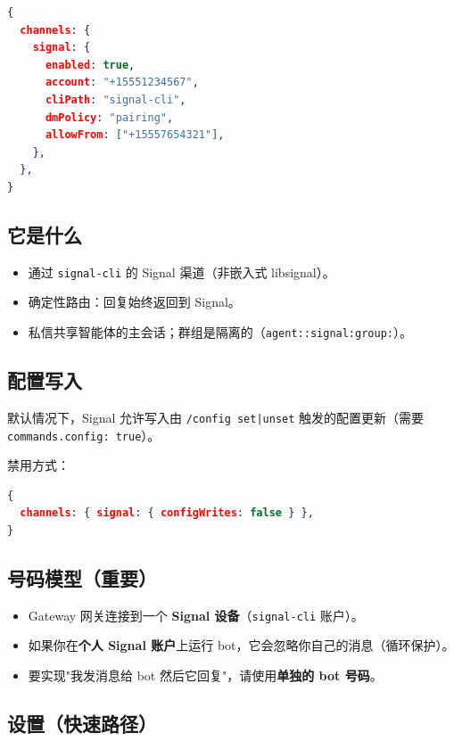 \begin{lstlisting}[language=json]
{
  channels: {
    signal: {
      enabled: true,
      account: "+15551234567",
      cliPath: "signal-cli",
      dmPolicy: "pairing",
      allowFrom: ["+15557654321"],
    },
  },
}
\end{lstlisting}


\subsection{它是什么}


\begin{itemize}
  \item 通过 \texttt{signal-cli} 的 Signal 渠道（非嵌入式 libsignal）。
  \item 确定性路由：回复始终返回到 Signal。
  \item 私信共享智能体的主会话；群组是隔离的（\texttt{agent::signal:group:}）。
\end{itemize}


\subsection{配置写入}


默认情况下，Signal 允许写入由 \texttt{/config set|unset} 触发的配置更新（需要 \texttt{commands.config: true}）。

禁用方式：

\begin{lstlisting}[language=json]
{
  channels: { signal: { configWrites: false } },
}
\end{lstlisting}


\subsection{号码模型（重要）}


\begin{itemize}
  \item Gateway 网关连接到一个 \textbf{Signal 设备}（\texttt{signal-cli} 账户）。
  \item 如果你在\textbf{个人 Signal 账户}上运行 bot，它会忽略你自己的消息（循环保护）。
  \item 要实现"我发消息给 bot 然后它回复"，请使用\textbf{单独的 bot 号码}。
\end{itemize}


\subsection{设置（快速路径）}


